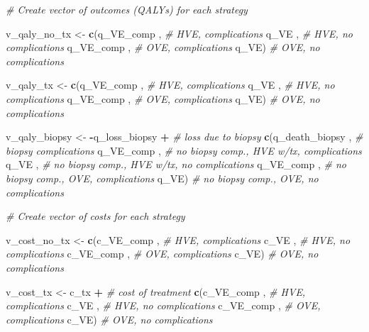 \documentclass[
]{article}
\newenvironment{Shaded}{\begin{snugshade}}{\end{snugshade}}
\newcommand{\CommentTok}[1]{\textcolor[rgb]{0.56,0.35,0.01}{\textit{#1}}}
\newcommand{\KeywordTok}[1]{\textcolor[rgb]{0.13,0.29,0.53}{\textbf{#1}}}
\newcommand{\NormalTok}[1]{#1}
\newcommand{\OperatorTok}[1]{\textcolor[rgb]{0.81,0.36,0.00}{\textbf{#1}}}
\newcommand{\StringTok}[1]{\textcolor[rgb]{0.31,0.60,0.02}{#1}}
\begin{document}
\begin{Shaded}
\begin{Highlighting}[]
\CommentTok{# Create vector of outcomes (QALYs) for each strategy }
  
\NormalTok{v_qaly_no_tx  <-}\StringTok{ }\KeywordTok{c}\NormalTok{(q_VE_comp ,          }\CommentTok{# HVE, complications}
\NormalTok{                   q_VE      ,          }\CommentTok{# HVE, no complications}
\NormalTok{                   q_VE_comp ,          }\CommentTok{# OVE, complications}
\NormalTok{                   q_VE)                }\CommentTok{# OVE, no complications}
  
\NormalTok{v_qaly_tx     <-}\StringTok{ }\KeywordTok{c}\NormalTok{(q_VE_comp ,          }\CommentTok{# HVE, complications}
\NormalTok{                   q_VE      ,          }\CommentTok{# HVE, no complications}
\NormalTok{                   q_VE_comp ,          }\CommentTok{# OVE, complications}
\NormalTok{                   q_VE)                }\CommentTok{# OVE, no complications}
  
  
\NormalTok{v_qaly_biopsy <-}\StringTok{ }\OperatorTok{-}\NormalTok{q_loss_biopsy     }\OperatorTok{+}\StringTok{   }\CommentTok{# loss due to biopsy}
\StringTok{                  }\KeywordTok{c}\NormalTok{(q_death_biopsy  ,   }\CommentTok{# biopsy complications}
\NormalTok{                    q_VE_comp       ,   }\CommentTok{# no biopsy comp., HVE w/tx, complications }
\NormalTok{                    q_VE            ,   }\CommentTok{# no biopsy comp., HVE w/tx, no complications}
\NormalTok{                    q_VE_comp       ,   }\CommentTok{# no biopsy comp., OVE, complications}
\NormalTok{                    q_VE)               }\CommentTok{# no biopsy comp., OVE, no complications}
  
\CommentTok{# Create vector of costs for each strategy }
  
\NormalTok{v_cost_no_tx  <-}\StringTok{ }\KeywordTok{c}\NormalTok{(c_VE_comp ,          }\CommentTok{# HVE, complications}
\NormalTok{                   c_VE      ,          }\CommentTok{# HVE, no complications}
\NormalTok{                   c_VE_comp ,          }\CommentTok{# OVE, complications}
\NormalTok{                   c_VE)                }\CommentTok{# OVE, no complications}
  
\NormalTok{v_cost_tx     <-}\StringTok{ }\NormalTok{c_tx }\OperatorTok{+}\StringTok{                 }\CommentTok{# cost of treatment}
\StringTok{                 }\KeywordTok{c}\NormalTok{(c_VE_comp ,          }\CommentTok{# HVE, complications}
\NormalTok{                   c_VE      ,          }\CommentTok{# HVE, no complications}
\NormalTok{                   c_VE_comp ,          }\CommentTok{# OVE, complications}
\NormalTok{                   c_VE)                }\CommentTok{# OVE, no complications}
  

\end{Highlighting}
\end{Shaded}
\end{document}
